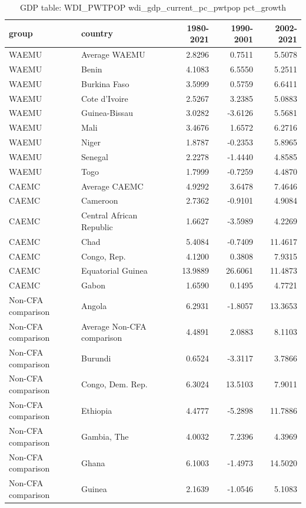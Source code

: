 \begin{table}

\caption{GDP table: WDI_PWTPOP wdi_gdp_current_pc_pwtpop pct_growth}
\centering
\begin{tabular}[t]{llrrr}
\toprule
group & country & 1980-2021 & 1990-2001 & 2002-2021\\
\midrule
WAEMU & Average WAEMU & 2.8296 & 0.7511 & 5.5078\\
WAEMU & Benin & 4.1083 & 6.5550 & 5.2511\\
WAEMU & Burkina Faso & 3.5999 & 0.5759 & 6.6411\\
WAEMU & Cote d'Ivoire & 2.5267 & 3.2385 & 5.0883\\
WAEMU & Guinea-Bissau & 3.0282 & -3.6126 & 5.5681\\
\addlinespace
WAEMU & Mali & 3.4676 & 1.6572 & 6.2716\\
WAEMU & Niger & 1.8787 & -0.2353 & 5.8965\\
WAEMU & Senegal & 2.2278 & -1.4440 & 4.8585\\
WAEMU & Togo & 1.7999 & -0.7259 & 4.4870\\
CAEMC & Average CAEMC & 4.9292 & 3.6478 & 7.4646\\
\addlinespace
CAEMC & Cameroon & 2.7362 & -0.9101 & 4.9084\\
CAEMC & Central African Republic & 1.6627 & -3.5989 & 4.2269\\
CAEMC & Chad & 5.4084 & -0.7409 & 11.4617\\
CAEMC & Congo, Rep. & 4.1200 & 0.3808 & 7.9315\\
CAEMC & Equatorial Guinea & 13.9889 & 26.6061 & 11.4873\\
\addlinespace
CAEMC & Gabon & 1.6590 & 0.1495 & 4.7721\\
Non-CFA comparison & Angola & 6.2931 & -1.8057 & 13.3653\\
Non-CFA comparison & Average Non-CFA comparison & 4.4891 & 2.0883 & 8.1103\\
Non-CFA comparison & Burundi & 0.6524 & -3.3117 & 3.7866\\
Non-CFA comparison & Congo, Dem. Rep. & 6.3024 & 13.5103 & 7.9011\\
\addlinespace
Non-CFA comparison & Ethiopia & 4.4777 & -5.2898 & 11.7886\\
Non-CFA comparison & Gambia, The & 4.0032 & 7.2396 & 4.3969\\
Non-CFA comparison & Ghana & 6.1003 & -1.4973 & 14.5020\\
Non-CFA comparison & Guinea & 2.1639 & -1.0546 & 5.1083\\

\end{tabular}
\end{table}

